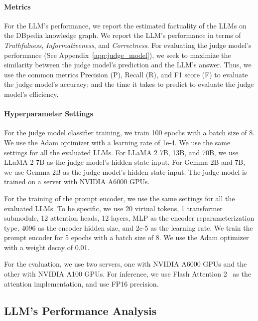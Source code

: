 \paragraph{Metrics}
 For the LLM's performance, we report the estimated factuality of the LLMs on the DBpedia knowledge graph. We report the LLM's performance in terms of \textit{Truthfulness}, \textit{Informativeness}, and \textit{Correctness}. For evaluating the judge model's performance (See Appendix~\ref{app:judge_model}), we seek to maximize the similarity between the judge model's prediction and the LLM's answer. Thus, we use the common metrics Precision (P), Recall (R), and F1 score (F) to evaluate the judge model's accuracy; and the time it takes to predict to evaluate the judge model's efficiency.

\paragraph{Hyperparameter Settings}
For the judge model classifier training, we train 100 epochs with a batch size of 8. We use the Adam optimizer with a learning rate of 1e-4. We use the same settings for all the evaluated LLMs. For LLaMA 2 7B, 13B, and 70B, we use LLaMA 2 7B as the judge model's hidden state input. For Gemma 2B and 7B, we use Gemma 2B as the judge model's hidden state input.
 The judge model is trained on a server with NVIDIA A6000 GPUs.

For the training of the prompt encoder, we use the same settings for all the evaluated LLMs. To be specific, we use 20 virtual tokens, 1 transformer submodule, 12 attention heads, 12 layers, MLP as the encoder reparameterization type, 4096 as the encoder hidden size, and 2e-5 as the learning rate. We train the prompt encoder for 5 epochs with a batch size of 8. We use the Adam optimizer with a weight decay of 0.01.

 For the evaluation, we use two servers, one with NVIDIA A6000 GPUs and the other with NVIDIA A100 GPUs. For inference, we use Flash Attention 2~\cite{dao2023flashattention2} as the attention implementation, and use FP16 precision.


\subsection{LLM's Performance Analysis}\label{sub:performance_analysis}


